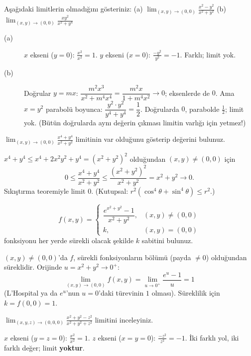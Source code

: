 \begin{soru}
Aşağıdaki limitlerin olmadığını gösteriniz:
(a) $\displaystyle\lim_{(x,y)\to(0,0)}\frac{x^2-y^2}{x^2+y^2}$ \qquad
(b) $\displaystyle\lim_{(x,y)\to(0,0)}\frac{xy^2}{x^2+y^4}$
\end{soru}
\begin{cevap}
\begin{description}
  \item[(a)] $x$ ekseni ($y=0$): $\frac{x^2}{x^2}=1$. $y$ ekseni ($x=0$): $\frac{-y^2}{y^2}=-1$. Farklı; limit yok.
  \item[(b)] Doğrular $y=mx$: $\dfrac{m^2x^3}{x^2+m^4x^4}=\dfrac{m^2x}{1+m^4x^2}\to0$; eksenlerde de $0$. Ama $x=y^2$
  parabolü boyunca: $\dfrac{y^2\cdot y^2}{y^4+y^4}=\dfrac12$. Doğrularda $0$, parabolde $\frac12$; limit yok.
  (Bütün doğrularda aynı değerin çıkması limitin varlığı için yetmez!)
\end{description}
\end{cevap}

\begin{soru}
$\displaystyle\lim_{(x,y)\to(0,0)}\frac{x^4+y^4}{x^2+y^2}$ limitinin var olduğunu gösterip değerini bulunuz.
\end{soru}
\begin{cevap}
$x^4+y^4\le x^4+2x^2y^2+y^4=(x^2+y^2)^2$ olduğundan $(x,y)\neq(0,0)$ için
\[
0\le\frac{x^4+y^4}{x^2+y^2}\le\frac{(x^2+y^2)^2}{x^2+y^2}=x^2+y^2\to0 .
\]
Sıkıştırma teoremiyle limit $0$. (Kutupsal: $r^2(\cos^4\theta+\sin^4\theta)\le r^2$.)
\end{cevap}

\begin{soru}
\[
f(x,y)=\begin{cases}\dfrac{e^{x^2+y^2}-1}{x^2+y^2}, & (x,y)\neq(0,0)\\[6pt] k, & (x,y)=(0,0)\end{cases}
\]
fonksiyonu her yerde sürekli olacak şekilde $k$ sabitini bulunuz.
\end{soru}
\begin{cevap}
$(x,y)\neq(0,0)$'da $f$, sürekli fonksiyonların bölümü (payda $\neq0$) olduğundan süreklidir. Orijinde $u=x^2+y^2\to0^+$:
\[
\lim_{(x,y)\to(0,0)}f(x,y)=\lim_{u\to0^+}\frac{e^u-1}{u}=1
\]
(L'Hospital ya da $e^u$'nun $u=0$'daki türevinin $1$ olması). Süreklilik için $k=f(0,0)=1$.
\end{cevap}

\begin{soru}
$\displaystyle\lim_{(x,y,z)\to(0,0,0)}\frac{x^2+y^2-z^2}{x^2+y^2+z^2}$ limitini inceleyiniz.
\end{soru}
\begin{cevap}
$x$ ekseni ($y=z=0$): $\frac{x^2}{x^2}=1$. $z$ ekseni ($x=y=0$): $\frac{-z^2}{z^2}=-1$. İki farklı yol, iki farklı değer;
limit \textbf{yoktur}.
\end{cevap}

